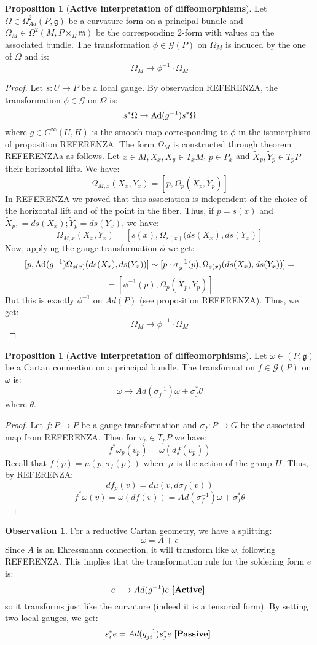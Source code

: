 \documentclass[12pt,a4paper]{report}
\theoremstyle{definition}
\theoremstyle{Theorem}
\newtheorem{Prop}[Def]{Proposition}
\theoremstyle{definition}
\theoremstyle{definition}
\newtheorem{Obs}[Def]{Observation}
\begin{document}
	\begin{Prop} [\textbf{Active interpretation of diffeomorphisms}]
		Let $\Omega\in \Omega^2_{Ad}(P,\mathfrak{g})$ be a curvature form on a principal bundle and $\Omega_M\in\Omega^2(M,P\times_{H}\mathfrak{m})$ be the corresponding $2$-form with values on the associated bundle. The transformation $\phi\in\mathcal{G}(P)$ on $\Omega_M$ is induced by the one of $\Omega$ and is:
		$$\Omega_M\rightarrow \phi^{-1}\cdot \Omega_M$$
	\end{Prop}
	\begin{proof}
		Let $s:U\rightarrow P$ be a local gauge. By observation REFERENZA, the transformation $\phi\in\mathcal{G}$ on $\Omega$ is:
		$$s^*\Omega\rightarrow \hbox{Ad}(g^{-1})s^*\Omega$$
		where $g\in C^\infty(U,H)$ is the smooth map corresponding to $\phi$ in the isomorphism of proposition REFERENZA. The form $\Omega_M$ is constructed through theorem REFERENZAa as follows. Let $x\in M,X_x,X_y\in T_xM$, $p\in P_x$ and $\tilde{X}_p,\tilde{Y}_p\in T_pP$ their horizontal lifts. We have:
		$$\Omega_{M,x}(X_x,Y_x)=[p,\Omega_p(\tilde{X}_p,\tilde{Y}_p)]$$
		In REFERENZA we proved that this association is independent of the choice of the horizontal lift and of the point in the fiber. Thus, if $p=s(x)$ and $\tilde{X}_p,=ds(X_x);\tilde{Y}_p=ds(Y_x)$, we have:
		$$\Omega_{M,x}(X_x,Y_x)=[s(x),\Omega_{s(x)}(ds(X_x),ds(Y_x)]$$
		Now, applying the gauge transformation $\phi$ we get:
		$$[p,\hbox{Ad}(g^{-1})\Omega_{s(x)}(ds(X_x),ds(Y_x))]\sim [p\cdot \sigma^{-1}_\phi(p),\Omega_{s(x)}(ds(X_x),ds(Y_x))]=$$
		$$=[\phi^{-1}(p),\Omega_p(\tilde{X}_p,\tilde{Y}_p)]$$
		But this is exactly $\phi^{-1}$ on $Ad(P)$ (see proposition REFERENZA). Thus, we get:
		$$\Omega_M\rightarrow \phi^{-1}\cdot \Omega_M$$
	\end{proof}
	\begin{Prop} [\textbf{Active interpretation of diffeomorphisms}]
		Let $\omega\in (P,\mathfrak{g})$ be a Cartan connection on a principal bundle. The transformation $f\in\mathcal{G}(P)$ on $\omega$ is:
		$$\omega\rightarrow Ad(\sigma_f^{-1}) \omega+\sigma_f^*\theta$$
		where $\theta$.
	\end{Prop}
	\begin{proof}
		Let $f:P\rightarrow P$ be a gauge transformation and $\sigma_f:P\rightarrow G$ be the associated map from REFERENZA. Then for $v_p\in T_pP$ we have:
		$$f^*\omega_p(v_p)=\omega(df(v_p))$$
		Recall that $f(p)=\mu(p,\sigma_f(p))$ where $\mu$ is the action of the group $H$. Thus, by REFERENZA: 
		$$df_p(v)=d\mu(v,d\sigma_f(v))$$
		$$f^*\omega(v)=\omega(df(v))=Ad(\sigma_f^{-1})\omega+\sigma_f^*\theta$$
	\end{proof}
	\begin{Obs}
		For a reductive Cartan geometry, we have a splitting:
		$$\omega=A+e$$
		Since $A$ is an Ehressmann connection, it will transform like $\omega$, following REFERENZA. This implies that the transformation rule for the soldering form $e$ is:
		$$e\longrightarrow Ad(g^{-1})e\hbox{ \textbf{[Active] }}$$
		so it transforms just like the curvature (indeed it is a tensorial form). By setting two local gauges, we get:
		$$s_i^*e= Ad(g_{ji}^{-1})s_j^*e\hbox{ \textbf{[Passive] }}$$
	\end{Obs}
\end{document}
